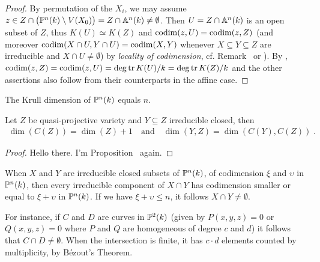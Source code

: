 \documentclass[a4paper,parskip=half,numbers=enddot, DIV=12]{scrreprt}
\begin{document}
\begin{proof}
    By permutation of the $X_i$, we may assume $z\in Z\cap \big(\mathbb{P}^n(k)\setminus V(X_0)\big) = Z\cap \mathbb{A}^n(k)\neq \emptyset$. Then $U=Z\cap \mathbb{A}^n(k)$ is an open subset of $Z$, thus $K(U)\simeq K(Z)$ and $\operatorname{codim}(z,U) = \operatorname{codim}(z,Z)$ (and moreover $\operatorname{codim}(X\cap U, Y\cap U) = \operatorname{codim}(X,Y)$ whenever $X\subseteq Y\subseteq Z$ are irreducible and $X\cap U\neq \emptyset$) by \emph{locality of codimension}, cf. Remark~ or \cite[Remark~2.1.3]{alg1}). By \cite[Theorem~6]{alg1}, $\operatorname{codim} (z,Z) = \operatorname{codim}(z,U) = \deg\operatorname{tr} K(U)/k = \deg\operatorname{tr} K(Z)/k$ and the other assertions also follow from their counterparts in the affine case.
\end{proof}
\begin{cor}
    The Krull dimension of $\mathbb{P}^n(k)$ equals $n$.
\end{cor}
\begin{prop}
    Let $Z$ be quasi-projective variety and $Y\subseteq Z$ irreducible closed, then 
    \begin{align*}
        \dim(C(Z)) = \dim(Z) +1\quad\text{and}\quad
        \dim(Y,Z) = \dim(C(Y), C(Z))\;.
    \end{align*}
\end{prop}
\begin{proof}
	Hello there. I'm Proposition~ again.
\end{proof}
\begin{thm}
    When $X$ and $Y$ are irreducible closed subsets of $\mathbb{P}^n(k)$, of codimension $\xi$ and $\upsilon$ in $\mathbb{P}^n(k)$, then every irreducible component of $X\cap Y$ has codimension smaller or equal to $\xi +\upsilon$ in $\mathbb{P}^n(k)$. If we have $\xi+\upsilon \leq n$, it follows $X\cap Y \neq \emptyset$.
\end{thm}
\begin{rem*}
    For instance, if $C$ and $D$ are curves in $\mathbb{P}^2(k)$ (given by $P(x,y,z) = 0$ or $Q(x,y,z)= 0$ where $P$ and $Q$ are homogeneous of degree $c$ and $d$) it follows that $C\cap D \neq \emptyset$. When the intersection is finite, it has $c\cdot d$ elements counted by multiplicity, by B\'ezout's Theorem.
\end{rem*}
\end{document}
